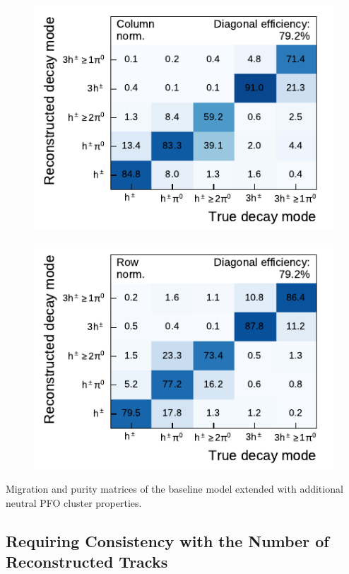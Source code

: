 \noindent
\begin{minipage}{\textwidth}
  \captionsetup{type=figure}
  \begin{subfigure}[t]{0.48\textwidth}
    \centering
    \includegraphics{./figures/decay_mode_classification/experiments/mig_mat_moments.pdf}
  \end{subfigure}\hfill
  \begin{subfigure}[t]{0.48\textwidth}
    \centering
    \includegraphics{./figures/decay_mode_classification/experiments/comp_mat_moments.pdf}
  \end{subfigure}
  \caption{Migration and purity matrices of the baseline model extended with
    additional neutral PFO cluster properties.}
\end{minipage}

\clearpage
\subsection{Requiring Consistency with the Number of Reconstructed Tracks}
\label{app:mode_classification_track_constraint}

